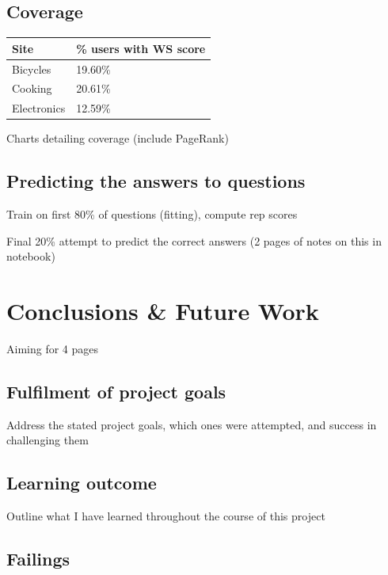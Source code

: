 \documentclass[]{final_report}
\begin{document}
\section{Coverage}

\begin{minipage}{\linewidth}
\centering
\begin{tabular}{|l|l|}
\hline \textbf{Site} & \textbf{\% users with WS score} \\ 
\hline Bicycles & 19.60\% \\ 
\hline Cooking & 20.61\% \\ 
\hline Electronics & 12.59\% \\ 
\hline 
\end{tabular}\par
{} \label{tab:coverage}
\end{minipage}

Charts detailing coverage (include PageRank)

\section{Predicting the answers to questions}

Train on first 80\% of questions (fitting), compute rep scores 

Final 20\% attempt to predict the correct answers (2 pages of notes on this in notebook)

\chapter{Conclusions \& Future Work}

Aiming for 4 pages

\section{Fulfilment of project goals}

Address the stated project goals, which ones were attempted, and success in challenging them

\section{Learning outcome}

Outline what I have learned throughout the course of this project

\section{Failings}
\end{document}
